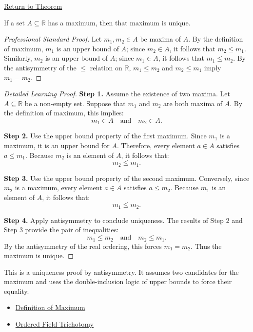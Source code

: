 \newpage
{}
\label{prf:uniqueness-of-the-maximum}

\begin{remark*}[Return]
\hyperref[prop:uniqueness-of-the-maximum]{Return to Theorem}
\end{remark*}

\begin{proposition*}
If a set $A \subseteq \mathbb{R}$ has a maximum, then that maximum is unique.
\end{proposition*}

\begin{proof}[Professional Standard Proof]
\LRAProofBodyStart
Let $m_1, m_2 \in A$ be maxima of $A$. By the definition of maximum, $m_1$ is an upper bound of $A$; since $m_2 \in A$, it follows that $m_2 \le m_1$. Similarly, $m_2$ is an upper bound of $A$; since $m_1 \in A$, it follows that $m_1 \le m_2$. By the antisymmetry of the $\le$ relation on $\mathbb{R}$, $m_1 \le m_2$ and $m_2 \le m_1$ imply $m_1 = m_2$.
\end{proof}

\begin{proof}[Detailed Learning Proof]
\LRAProofBodyStart

\textbf{Step 1.} Assume the existence of two maxima.
Let $A \subseteq \mathbb{R}$ be a non-empty set. Suppose that $m_1$ and $m_2$ are both maxima of $A$. By the definition of maximum, this implies:
\[
m_1 \in A \quad \text{and} \quad m_2 \in A.
\]

\textbf{Step 2.} Use the upper bound property of the first maximum.
Since $m_1$ is a maximum, it is an upper bound for $A$. Therefore, every element $a \in A$ satisfies $a \le m_1$. Because $m_2$ is an element of $A$, it follows that:
\[
m_2 \le m_1.
\]

\textbf{Step 3.} Use the upper bound property of the second maximum.
Conversely, since $m_2$ is a maximum, every element $a \in A$ satisfies $a \le m_2$. Because $m_1$ is an element of $A$, it follows that:
\[
m_1 \le m_2.
\]

\textbf{Step 4.} Apply antisymmetry to conclude uniqueness.
The results of Step 2 and Step 3 provide the pair of inequalities:
\[
m_1 \le m_2 \quad \text{and} \quad m_2 \le m_1.
\]
By the antisymmetry of the real ordering, this forces $m_1 = m_2$. Thus the maximum is unique.
\end{proof}

\begin{remark*}
This is a uniqueness proof by antisymmetry. It assumes two candidates for the maximum and uses the double-inclusion logic of upper bounds to force their equality.
\end{remark*}

\begin{dependencies}
\begin{itemize}
  \item \hyperref[def:maximum]{Definition of Maximum}
  \item \hyperref[ax:ordered-field-trichotomy]{Ordered Field Trichotomy}
\end{itemize}
\end{dependencies}

\clearpage
